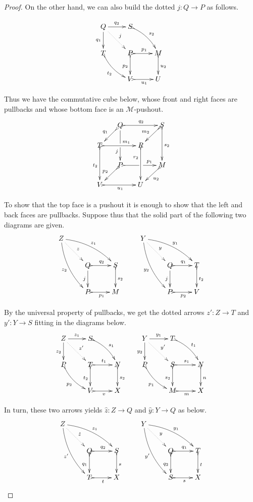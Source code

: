 \documentclass[a4paper]{article}
\renewcommand{\P}{\textbf {\textup{P}}}
\theoremstyle{definition}
\begin{document}
\begin{proof}
On the other hand, we can also build the dotted $j\colon Q\to P$ as follows.

		\[\xymatrix{Q \ar[r]^{q_2} \ar[d]_{q_1} \ar@{.>}[dr]^{j}& S \ar@{>->}@/^.2cm/[dr]^{s_2}\\ T \ar@{>->}@/_.2cm/[dr]_{t_2}&P \ar@{>->}[r]^{p_1} \ar@{>->}[d]_{p_2} & M\ar@{>->}[d]^{u_2}  \\ &V \ar@{>->}[r]_{u_1} & U }\]
	
	Thus we have the commutative cube below, whose front and right faces are pullbacks and whose bottom face is an $\mathcal{M}$-pushout.
		\[\xymatrix@C=15pt@R=15pt{&Q\ar[dd]|\hole_(.65){j}\ar@{>->}[rr]^{q_2} \ar@{>->}[dl]_{q_1} && S \ar@{>->}[dd]^{s_2} \ar@{>->}[dl]_{m_2}\\ T \ar@{>->}[dd]_{t_2}\ar@{>->}[rr]^(.65){m_1} & & R \ar@{>->}[dd]_(.3){r_2}\\&P\ar@{>->}[rr]|\hole^(.7){p_1} \ar@{>->}[dl]_{p_2} && M \ar@{>->}[dl]^{u_2} \\V \ar@{>->}[rr]_{u_1} & & U}\]
		
		To show that the top face is a pushout it is enough to show that the left and back faces are pullbacks. Suppose thus that the solid part of the following two diagrams are given.
		\[\xymatrix{Z \ar@{.>}[dr]^{z} \ar@/^.3cm/[drr]^{z_1} \ar@/_.3cm/[ddr]_{z_2}&& &Y \ar@{.>}[dr]^{y} \ar@/^.3cm/[drr]^{y_1} \ar@/_.3cm/[ddr]_{y_2}\\&Q \ar@{>->}[r]^{q_2} \ar[d]_j & S \ar@{>->}[d]^{s_2}& &Q \ar@{>->}[r]^{q_1} \ar[d]_{j} & T \ar@{>->}[d]^{t_2}\\& P \ar@{>->}[r]_{p_1} & M && P \ar@{>->}[r]_{p_2}& V}\]
		
		By the universal property of pullbacks, we get the dotted arrows $z'\colon Z\to T$ and $y'\colon Y\to S$ fitting in the diagrams below.
		\[\xymatrix{Z \ar@{.>}[dr]^{z'} \ar[r]^{z_1} \ar[d]_{z_2}& S \ar@{>->}@/^.2cm/[dr]^{s_1}& &Y \ar@{.>}[dr]^{y'} \ar[r]^{y_1} \ar[d]_{y_2} & T  \ar@{>->}@/^.2cm/[dr]^{t_1}\\P \ar@{>->}@/_.2cm/[dr]_{p_2}&T \ar@{>->}[r]^{t_1} \ar@{>->}[d]_{t_2} & N \ar@{>->}[d]^{s_2}& P\ar@{>->}@/_.2cm/[dr]_{p_1}&S \ar@{>->}[r]^{s_1} \ar@{>->}[d]_{s_2} & N \ar@{>->}[d]^{n}\\& V \ar@{>->}[r]_{v} & X && M \ar@{>->}[r]_{m}& X}\]
		
		In turn, these two arrows yields $\hat{z}\colon Z \to Q$ and $\hat{y}\colon Y \to Q$ as below.
				\[\xymatrix{Z \ar@{.>}[dr]^{\hat{z}} \ar@/^.3cm/[drr]^{z_1} \ar@/_.3cm/[ddr]_{z'}&& &Y \ar@{.>}[dr]^{y} \ar@/^.3cm/[drr]^{y_1} \ar@/_.3cm/[ddr]_{y'}\\&Q \ar@{>->}[r]^{q_2} \ar@{>->}[d]_{q_1} & S \ar@{>->}[d]^{s}& &Q \ar@{>->}[r]^{q_1} \ar@{>->}[d]_{q_2} & T \ar@{>->}[d]^{t}\\& T \ar@{>->}[r]_{t} & X && S \ar@{>->}[r]_{s}& X}\]
	

\end{proof}
\end{document}
